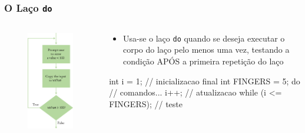\documentclass[xcolor={dvipsnames,table},aspectratio=169]{beamer}
\begin{document}
\begin{frame}[fragile]\frametitle{O Laço \texttt{do}}
\begin{columns}[T]
	\begin{column}{0.3\linewidth}
\begin{figure}[h]
	\includegraphics[height=0.65\paperheight,center]{pucrs-ep-fprog-unidade_04-lacos-laminas-fluxograma_laco_do.png}
\end{figure}
	\end{column}
	\begin{column}{0.7\linewidth}
\begin{itemize}
	\item Usa-se o laço \texttt{do} quando se deseja executar o corpo do laço pelo menos uma vez, testando a condição APÓS a primeira repetição do laço
\end{itemize}
\begin{javacode}
int i = 1;  // inicializacao
final int FINGERS = 5;
do {
   // comandos...
   i++; // atualizacao
}  while (i <= FINGERS);  // teste
\end{javacode}
	\end{column}
\end{columns}

\end{frame}
\end{document}
